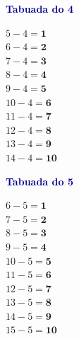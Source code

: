 \documentclass[12pt]{article}
\begin{document}
\begin{minipage}[t]{3.3cm}
\noindent\textcolor{darkblue}{\bfseries\small Tabuada do 4}\par\vspace{2pt}
{\footnotesize
$5-4=\mathbf{1}$\\$6-4=\mathbf{2}$\\$7-4=\mathbf{3}$\\
$8-4=\mathbf{4}$\\$9-4=\mathbf{5}$\\$10-4=\mathbf{6}$\\
$11-4=\mathbf{7}$\\$12-4=\mathbf{8}$\\$13-4=\mathbf{9}$\\
$14-4=\mathbf{10}$}
\end{minipage}\hfill
\begin{minipage}[t]{3.3cm}
\noindent\textcolor{darkblue}{\bfseries\small Tabuada do 5}\par\vspace{2pt}
{\footnotesize
$6-5=\mathbf{1}$\\$7-5=\mathbf{2}$\\$8-5=\mathbf{3}$\\
$9-5=\mathbf{4}$\\$10-5=\mathbf{5}$\\$11-5=\mathbf{6}$\\
$12-5=\mathbf{7}$\\$13-5=\mathbf{8}$\\$14-5=\mathbf{9}$\\
$15-5=\mathbf{10}$}
\end{minipage}
\end{document}
